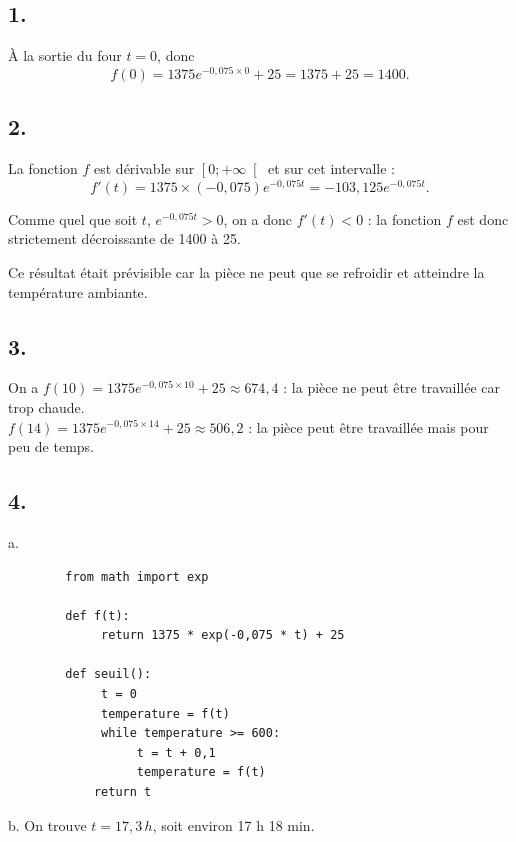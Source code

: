 \subsection*{1.}
	
	À la sortie du four \(t = 0\), donc
	\[
	f(0) = 1375e^{-0,075 \times 0} + 25 = 1375 + 25 = 1400.
	\]
	
	\subsection*{2.}
	
	La fonction \(f\) est dérivable sur \(\left[0 ; +\infty\right[\) et sur cet intervalle :
	\[
	f'(t) = 1375 \times (-0,075)e^{-0,075t} = -103,125e^{-0,075t}.
	\]
	
	Comme quel que soit \(t\), \(e^{-0,075t} > 0\), on a donc \(f'(t) < 0\) : la fonction \(f\) est donc strictement décroissante de 1400 à 25.
	
	Ce résultat était prévisible car la pièce ne peut que se refroidir et atteindre la température ambiante.
	
	\subsection*{3.}
	
	On a
$
	f(10) = 1375e^{-0,075 \times 10} + 25 \approx 674,4$ : la pièce ne peut être travaillée car trop chaude.\\
$
	f(14) = 1375e^{-0,075 \times 14} + 25 \approx 506,2$ : la pièce peut être travaillée mais pour peu de temps.

	
	\subsection*{4.}
	
	a. 	\begin{verbatim}
		from math import exp
		
		def f(t):
		     return 1375 * exp(-0,075 * t) + 25
		
		def seuil():
		     t = 0
		     temperature = f(t)
		     while temperature >= 600:
		          t = t + 0,1
		          temperature = f(t)
	    	return t
	\end{verbatim}
	
	
	
	
	
	b. On trouve \(t = 17,3 \, h\), soit environ 17 h 18 min.
